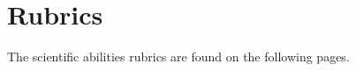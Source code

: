 
\chapter{Rubrics}\label{cha:rubrics}



The scientific abilities rubrics are found on the following pages.

